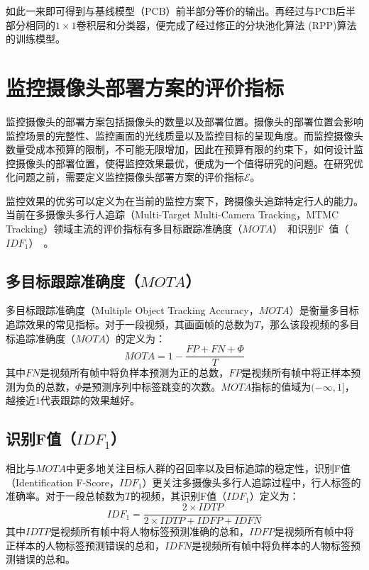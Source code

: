 如此一来即可得到与基线模型（PCB）前半部分等价的输出。再经过与PCB后半部分相同的$1\times1$卷积层和分类器，便完成了经过修正的分块池化算法 (RPP)算法的训练模型。

\section{监控摄像头部署方案的评价指标}

监控摄像头的部署方案包括摄像头的数量以及部署位置。摄像头的部署位置会影响监控场景的完整性、监控画面的光线质量以及监控目标的呈现角度。而监控摄像头数量受成本预算的限制，不可能无限增加，因此在预算有限的约束下，如何设计监控摄像头的部署位置，使得监控效果最优，便成为一个值得研究的问题。在研究优化问题之前，需要定义监控摄像头部署方案的评价指标$\mathcal{E}$。

监控效果的优劣可以定义为在当前的监控方案下，跨摄像头追踪特定行人的能力。当前在多摄像头多行人追踪（Multi-Target Multi-Camera Tracking，MTMC Tracking）领域主流的评价指标有多目标跟踪准确度（$\mathit{MOTA}$）~\cite{ristani2016MTMC}和识别F~值（$\mathit{IDF_1}$）~\cite{ristani2016MTMC}。

\subsection{多目标跟踪准确度（$\mathit{MOTA}$）}

多目标跟踪准确度（Multiple Object Tracking Accuracy，$\mathit{MOTA}$）是衡量多目标追踪效果的常见指标。对于一段视频，其画面帧的总数为$T$，那么该段视频的多目标追踪准确度（$\mathit{MOTA}$）的定义为：
\begin{equation}
\label{eq:mota}
\mathit{MOTA}=1-\frac{\mathit{FP}+\mathit{FN}+\Phi}{T}
\end{equation}
其中$\mathit{FN}$是视频所有帧中将负样本预测为正的总数，$\mathit{FP}$是视频所有帧中将正样本预测为负的总数，$\Phi$是预测序列中标签跳变的次数。$\mathit{MOTA}$指标的值域为$(-\infty,1]$，越接近1代表跟踪的效果越好。

\subsection{识别F值（$\mathit{IDF_1}$）}

相比与$\mathit{MOTA}$中更多地关注目标人群的召回率以及目标追踪的稳定性，识别F值（Identification F-Score，$\mathit{IDF_1}$）更关注多摄像头多行人追踪过程中，行人标签的准确率。对于一段总帧数为$T$的视频，其识别F值（$\mathit{IDF_1}$）定义为：
\begin{equation}
\mathit{IDF_1}=\frac{2\times\mathit{IDTP}}{2\times\mathit{IDTP}+\mathit{IDFP}+\mathit{IDFN}}
\end{equation}
其中$\mathit{IDTP}$是视频所有帧中将人物标签预测准确的总和，$\mathit{IDFP}$是视频所有帧中将正样本的人物标签预测错误的总和，$\mathit{IDFN}$是视频所有帧中将负样本的人物标签预测错误的总和。

